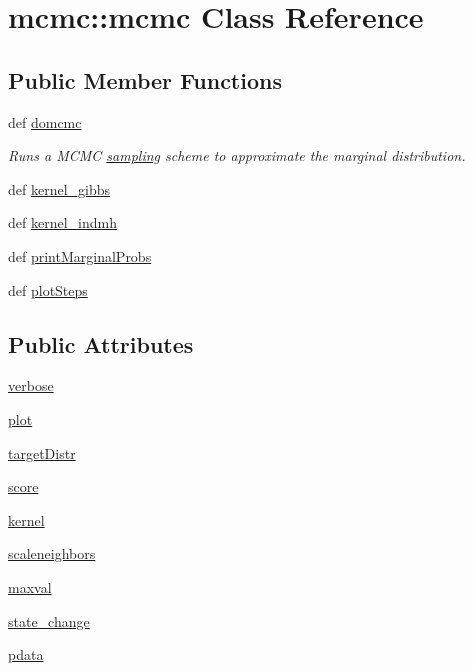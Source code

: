 \hypertarget{classmcmc_1_1mcmc}{
\section{mcmc::mcmc Class Reference}
\label{classmcmc_1_1mcmc}
}
\subsection*{Public Member Functions}
\begin{CompactItemize}
\item 
def \hyperlink{classmcmc_1_1mcmc_0a65f27f35aa71a335bc5e5b633b5242}{domcmc}
\begin{CompactList}\small\item\em Runs a MCMC \hyperlink{namespacesampling}{sampling} scheme to approximate the marginal distribution. \item\end{CompactList}\item 
def \hyperlink{classmcmc_1_1mcmc_54669cdc319c8ef04f8030a1b2b3664e}{kernel\_\-gibbs}
\item 
def \hyperlink{classmcmc_1_1mcmc_d42bf6f27a081b18507d87576cfa00e7}{kernel\_\-indmh}
\item 
def \hyperlink{classmcmc_1_1mcmc_92084a28766545a03bc2b45c0e858a99}{printMarginalProbs}
\item 
def \hyperlink{classmcmc_1_1mcmc_61ddda03459f328c4190dd15041909a9}{plotSteps}
\end{CompactItemize}
\subsection*{Public Attributes}
\begin{CompactItemize}
\item 
\hyperlink{classmcmc_1_1mcmc_b775e315b3afd728337a7ce76e051757}{verbose}
\item 
\hyperlink{classmcmc_1_1mcmc_3ae6df3dc0f30424737f9553e4ccdd59}{plot}
\item 
\hyperlink{classmcmc_1_1mcmc_75cf003947dd468b37dbe3db7c3be77b}{targetDistr}
\item 
\hyperlink{classmcmc_1_1mcmc_595bfdf51ae7ecb2ddb4c0729e134f31}{score}
\item 
\hyperlink{classmcmc_1_1mcmc_c0da164af953d15a6e59005616b78581}{kernel}
\item 
\hyperlink{classmcmc_1_1mcmc_76f97dc69cc27fe654f700e7612f2ace}{scaleneighbors}
\item 
\hyperlink{classmcmc_1_1mcmc_cd47deafd7039aa45fefd45af5db9a7c}{maxval}
\item 
\hyperlink{classmcmc_1_1mcmc_d44a8fd5b0a9d827b6922f9829a20fdf}{state\_\-change}
\item 
\hyperlink{classmcmc_1_1mcmc_e2b88838a2868340e27b6467368c16d7}{pdata}
\end{CompactItemize}


